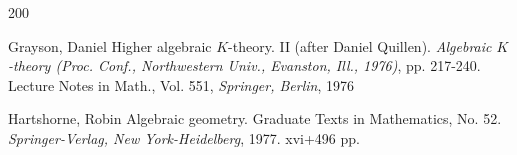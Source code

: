 \documentclass[12pt]{article}
\begin{document}
\begin{thebibliography}{200}

Grayson, Daniel Higher algebraic $K$-theory. II (after Daniel Quillen). 
{\it Algebraic $K$-theory (Proc. Conf., Northwestern Univ., Evanston, Ill., 1976)}, pp. 217-240. Lecture Notes in Math., Vol. 551, {\it Springer, Berlin}, 1976










 

 Hartshorne, Robin Algebraic geometry. Graduate Texts in Mathematics, No. 52. {\it Springer-Verlag, New York-Heidelberg}, 1977. xvi+496 pp.







\end{thebibliography}
\end{document}
